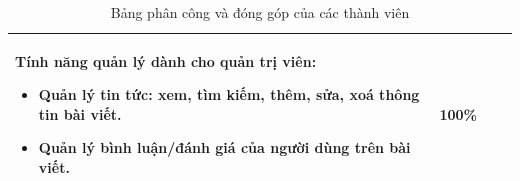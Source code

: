 \begin{table}[H]
\begin{tabular}{|p{1cm}|p{3.5cm}|p{8.5cm}|p{2cm}|}
		\textbf{Tính năng quản lý dành cho quản trị viên:}
		\begin{itemize}
			\item Quản lý tin tức: xem, tìm kiếm, thêm, sửa, xoá thông tin bài viết.
			\item Quản lý bình luận/đánh giá của người dùng trên bài viết.
		\end{itemize}
		&
		100\% \\
		\hline
		
	\end{tabular}
	\caption{Bảng phân công và đóng góp của các thành viên}
	\label{tab:dong-gop-thanh-vien}
\end{table}

\newpage